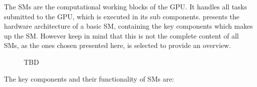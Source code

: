 The SMs are the computational working blocks of the GPU.
It handles all tasks submitted to the GPU, which is executed in its sub components.
 presents the hardware architecture of a basic SM, containing the key components which makes up the SM.
However keep in mind that this is not the complete content of all SMs, as the ones chosen presented here, is selected to provide an overview.

\begin{figure}[H]
	\centering
	\caption{TBD}
	\label{fig:hw-sm}
\end{figure}

The key components and their functionality of SMs are:

